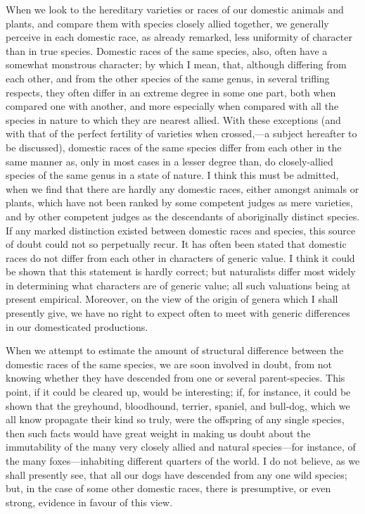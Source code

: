 \documentclass{book}
\begin{document}
When we look to the hereditary varieties or races of our domestic animals and
plants, and compare them with species closely allied together, we generally
perceive in each domestic race, as already remarked, less uniformity of
character than in true species. Domestic races of
the same species, also, often have a somewhat monstrous character; by which I
mean, that, although differing from each other, and from the other species of
the same genus, in several trifling respects, they often differ in an extreme
degree in some one part, both when compared one with another, and more
especially when compared with all the species in nature to which they are
nearest allied. With these exceptions (and with that of the perfect fertility
of varieties when crossed,---a subject hereafter to be discussed), domestic
races of the same species differ from each other in the same manner as, only in
most cases in a lesser degree than, do closely-allied species of the same genus
in a state of nature. I think this must be admitted, when we find that there
are hardly any domestic races, either amongst animals or plants, which have not
been ranked by some competent judges as mere varieties, and by other competent
judges as the descendants of aboriginally distinct species. If any marked
distinction existed between domestic races and species, this source of doubt
could not so perpetually recur. It has often been stated that domestic races do
not differ from each other in characters of generic value. I think it could be
shown that this statement is hardly correct; but naturalists differ most widely
in determining what characters are of generic value; all such valuations being
at present empirical. Moreover, on the view of the origin of genera which I
shall presently give, we have no right to expect often to meet with generic
differences in our domesticated productions.

When we attempt to estimate the amount of structural difference between the
domestic races of the same species, we are soon involved in doubt, from not
knowing whether they have descended from one or several parent-species. This
point, if it could be cleared up, would be interesting; if, for instance, it
could be shown that the greyhound,
bloodhound, terrier, spaniel, and bull-dog, which we all know propagate their
kind so truly, were the offspring of any single species, then such facts would
have great weight in making us doubt about the immutability of the many very
closely allied and natural species---for instance, of the many
foxes---inhabiting different quarters of the world. I do not believe, as we
shall presently see, that all our dogs have descended from any one wild
species; but, in the case of some other domestic races, there is presumptive,
or even strong, evidence in favour of this view.
\end{document}
